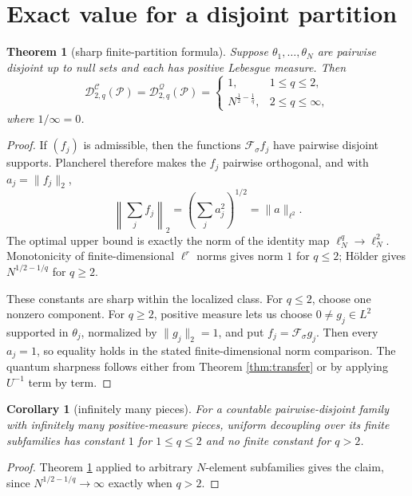 \documentclass[11pt]{article}
\newtheorem{theorem}{Theorem}
\newtheorem{corollary}{Corollary}
\newcommand{\Fc}{\mathcal F_{\sigma}}
\newcommand{\Dc}{\mathcal D^{\mathscr C}}
\newcommand{\Dq}{\mathcal D^{\mathscr Q}}
\begin{document}
\section{Exact value for a disjoint partition}

\begin{theorem}[sharp finite-partition formula]\label{thm:formula}
Suppose $\theta_1,\ldots,\theta_N$ are pairwise disjoint up to null sets and
each has positive Lebesgue measure.  Then
\[
 \Dc_{2,q}(\mathcal P)=\Dq_{2,q}(\mathcal P)
 =\begin{cases}
 1,&1\le q\le2,\\[2mm]
 N^{\frac12-\frac1q},&2\le q\le\infty,
 \end{cases}
\]
where $1/\infty=0$.
\end{theorem}

\begin{proof}
If $(f_j)$ is admissible, then the functions $\Fc f_j$ have pairwise
disjoint supports.  Plancherel therefore makes the $f_j$ pairwise
orthogonal, and with $a_j=\|f_j\|_2$,
\[
 \left\|\sum_j f_j\right\|_2
 =\left(\sum_j a_j^2\right)^{1/2}=\|a\|_{\ell^2}.
\]
The optimal upper bound is exactly the norm of the identity map
$\ell^q_N\to\ell^2_N$.  Monotonicity of finite-dimensional $\ell^r$ norms
gives norm $1$ for $q\le2$; H\"older gives
$N^{1/2-1/q}$ for $q\ge2$.

These constants are sharp within the localized class.  For $q\le2$, choose
one nonzero component.  For $q\ge2$, positive measure lets us choose
$0\ne g_j\in L^2$ supported in $\theta_j$, normalized by $\|g_j\|_2=1$,
and put $f_j=\Fc g_j$.  Then every $a_j=1$, so equality holds in the stated
finite-dimensional norm comparison.  The quantum sharpness follows either
from Theorem \ref{thm:transfer} or by applying $U^{-1}$ term by term.
\end{proof}

\begin{corollary}[infinitely many pieces]
For a countable pairwise-disjoint family with infinitely many
positive-measure pieces, uniform decoupling over its finite subfamilies has
constant $1$ for $1\le q\le2$ and no finite constant for $q>2$.
\end{corollary}

\begin{proof}
Theorem \ref{thm:formula} applied to arbitrary $N$-element subfamilies gives
the claim, since $N^{1/2-1/q}\to\infty$ exactly when $q>2$.
\end{proof}
\end{document}
